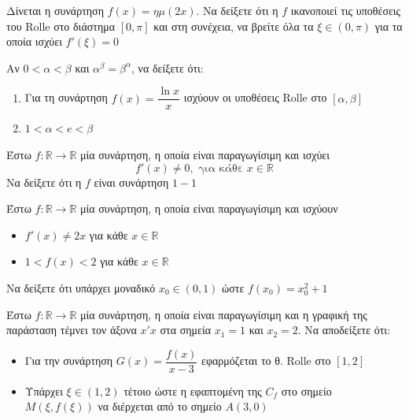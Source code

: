 \documentclass{presentation}
\begin{document}
\begin{askisi}
  Δίνεται η συνάρτηση $f(x)=ημ(2x)$. Να δείξετε ότι η $f$ ικανοποιεί τις υποθέσεις του Rolle στο διάστημα $[0,π]$ και στη συνέχεια, να βρείτε όλα τα $ξ\in (0,π)$ για τα οποία ισχύει $f'(ξ)=0$
\end{askisi}

\begin{askisi}
  Αν $0<α<β$ και $α^β=β^α$, να δείξετε ότι:
  \begin{enumerate}
    \item<1-> Για τη συνάρτηση $f(x)=\dfrac{\ln x}{x}$ ισχύουν οι υποθέσεις Rolle στο $[α,β]$
    \item<2-> $1<α<e<β$
  \end{enumerate}
\end{askisi}

\begin{askisi}
  Έστω $f:\mathbb{R}\to\mathbb{R}$ μία συνάρτηση, η οποία είναι παραγωγίσιμη και ισχύει
  $$f'(x)\ne 0, \text{ για κάθε } x\in\mathbb{R}$$
  Να δείξετε ότι η $f$ είναι συνάρτηση $1-1$
\end{askisi}

\begin{askisi}
  Έστω $f:\mathbb{R}\to\mathbb{R}$ μία συνάρτηση, η οποία είναι παραγωγίσιμη και ισχύουν
  \begin{itemize}
    \item $f'(x)\ne 2x$ για κάθε $x\in\mathbb{R}$
    \item $1<f(x)<2$ για κάθε $x\in\mathbb{R}$
  \end{itemize}
  Να δείξετε ότι υπάρχει μοναδικό $x_0\in (0,1)$ ώστε $f(x_0)=x_0^2+1$
\end{askisi}

\begin{askisi}
  Έστω $f:\mathbb{R}\to\mathbb{R}$ μία συνάρτηση, η οποία είναι παραγωγίσιμη και η γραφική της παράσταση τέμνει τον άξονα $x'x$ στα σημεία $x_1=1$ και $x_2=2$. Να αποδείξετε ότι:
  \begin{itemize}
    \item Για την συνάρτηση $G(x)=\dfrac{f(x)}{x-3}$ εφαρμόζεται το θ. Rolle στο $[1,2]$
    \item Υπάρχει $ξ\in (1,2)$ τέτοιο ώστε η εφαπτομένη της $C_f$ στο σημείο $Μ(ξ,f(ξ))$ να διέρχεται από το σημείο $Α(3,0)$
  \end{itemize}
\end{askisi}

\moodle
\end{document}
